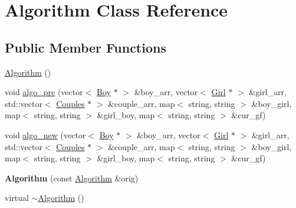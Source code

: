 \hypertarget{class_algorithm}{\section{Algorithm Class Reference}
\label{class_algorithm}
}
\subsection*{Public Member Functions}
\begin{DoxyCompactItemize}
\item 
\hyperlink{class_algorithm_a472bdce2086324f49da7794e27ccaa54}{Algorithm} ()
\item 
void \hyperlink{class_algorithm_ac026d2b55802bb3ab7170b8df59f809a}{algo\-\_\-pre} (vector$<$ \hyperlink{class_boy}{Boy} $\ast$ $>$ \&boy\-\_\-arr, vector$<$ \hyperlink{class_girl}{Girl} $\ast$ $>$ \&girl\-\_\-arr, std\-::vector$<$ \hyperlink{class_couples}{Couples} $\ast$ $>$ \&couple\-\_\-arr, map$<$ string, string $>$ \&boy\-\_\-girl, map$<$ string, string $>$ \&girl\-\_\-boy, map$<$ string, string $>$ \&cur\-\_\-gf)
\item 
void \hyperlink{class_algorithm_ab445415eb6d376ac4709b311a5f9ea21}{algo\-\_\-new} (vector$<$ \hyperlink{class_boy}{Boy} $\ast$ $>$ \&boy\-\_\-arr, vector$<$ \hyperlink{class_girl}{Girl} $\ast$ $>$ \&girl\-\_\-arr, std\-::vector$<$ \hyperlink{class_couples}{Couples} $\ast$ $>$ \&couple\-\_\-arr, map$<$ string, string $>$ \&boy\-\_\-girl, map$<$ string, string $>$ \&girl\-\_\-boy, map$<$ string, string $>$ \&cur\-\_\-gf)
\item 
\hypertarget{class_algorithm_a246d24f4e3ba1539ffe4c12554f0d119}{{\bfseries Algorithm} (const \hyperlink{class_algorithm}{Algorithm} \&orig)}\label{class_algorithm_a246d24f4e3ba1539ffe4c12554f0d119}

\item 
virtual \hyperlink{class_algorithm_ae2801c5b6cd6f45b3852d8c94f354cd5}{$\sim$\-Algorithm} ()
\end{DoxyCompactItemize}



